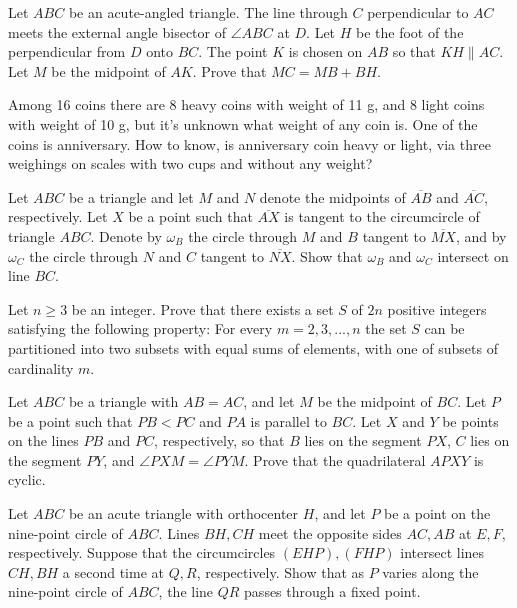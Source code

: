 \documentclass[11pt]{scrartcl}
\begin{document}
\begin{problem}[5441518070935718077]
	Let $ABC$ be an acute-angled triangle. The line through $C$ perpendicular to $AC$ meets the external angle bisector of $\angle ABC$ at $D$. Let $H$ be the foot of the perpendicular from $D$ onto $BC$. The point $K$ is chosen on $AB$ so that $KH \parallel AC$. Let $M$ be the midpoint of $AK$. Prove that $MC = MB + BH$.
\end{problem}
\begin{problem}[709461884323637120]
Among 16 coins there are 8 heavy coins with weight of 11 g, and 8 light coins with weight of 10 g, but it's unknown what weight of any coin is. One of the coins is anniversary. How to know, is anniversary coin heavy or light, via three weighings on scales with two cups and without any weight?
\end{problem}
\begin{problem}[503121367540901]
	Let $ABC$ be a triangle and let $M$ and $N$ denote the midpoints of $\overline{AB}$ and $\overline{AC}$, respectively. Let $X$ be a point such that $\overline{AX}$ is tangent to the circumcircle of triangle $ABC$. Denote by $\omega_B$ the circle through $M$ and $B$ tangent to $\overline{MX}$, and by $\omega_C$ the circle through $N$ and $C$ tangent to $\overline{NX}$. Show that $\omega_B$ and $\omega_C$ intersect on line $BC$.
\end{problem}
\begin{problem}[8059760967121829853]
	Let $n\geqslant 3$ be an integer. Prove that there exists a set $S$ of $2n$ positive integers satisfying the following property: For every $m=2,3,...,n$ the set $S$ can be partitioned into two subsets with equal sums of elements, with one of subsets of cardinality $m$.
\end{problem}
\begin{problem}[883811987981100]
Let $ABC$ be a triangle with $AB=AC$, and let $M$ be the midpoint of $BC$. Let $P$ be a point such that $PB<PC$ and $PA$ is parallel to $BC$. Let $X$ and $Y$ be points on the lines $PB$ and $PC$, respectively, so that $B$ lies on the segment $PX$, $C$ lies on the segment $PY$, and $\angle PXM=\angle PYM$. Prove that the quadrilateral $APXY$ is cyclic.
\end{problem}
\begin{problem}[8255863576892581507]
	Let $ABC$ be an acute triangle with orthocenter $H$, and let $P$ be a point on the nine-point circle of $ABC$. Lines $BH, CH$ meet the opposite sides $AC, AB$ at $E, F$, respectively. Suppose that the circumcircles $(EHP), (FHP)$ intersect lines $CH, BH$ a second time at $Q,R$, respectively. Show that as $P$ varies along the nine-point circle of $ABC$, the line $QR$ passes through a fixed point.
\end{problem}
\end{document}
